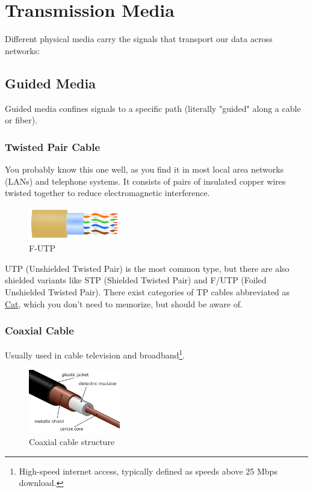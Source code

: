 \section{Transmission Media}\label{sec:transmission_media}
Different physical media carry the signals that transport our data across networks:

\subsection*{Guided Media}
Guided media confines signals to a specific path (literally "guided" along a cable or fiber). 

\subsubsection*{Twisted Pair Cable}
You probably know this one well, as you find it in most local area networks (LANs) and telephone systems. It consists of pairs of insulated copper wires twisted together to reduce electromagnetic interference.

\begin{figure}[h]
    \centering
    \includegraphics[width=4cm]{assets/osi/physical/f-utp.png}
    \caption{F-UTP}\label{fig:twisted_pair}
\end{figure}

UTP (Unshielded Twisted Pair) is the most common type, but there are also shielded variants like STP (Shielded Twisted Pair) and F/UTP (Foiled Unshielded Twisted Pair). There exist categories of TP cables abbreviated as \href{https://en.wikipedia.org/wiki/Category:Ethernet_cables}{Cat}, which you don't need to memorize, but should be aware of. 

\subsubsection*{Coaxial Cable}
Usually used in cable television and broadband\footnote{High-speed internet access, typically defined as speeds above 25 Mbps download.}.

\begin{figure}[h]
    \centering
    \includegraphics[width=4cm]{assets/osi/physical/coax.png}
    \caption{Coaxial cable structure}\label{fig:coaxial_cable}
\end{figure}

